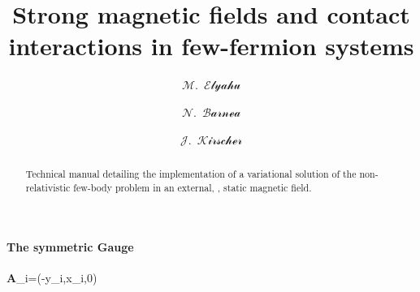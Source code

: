 \documentclass[aps,prd,onecolumn
,tightenlines,letterpaper,notitlepage,
nofootinbib]{revtex4-1}
\begin{document}
\newcommand{\rgm}{$\mathbb{R}$GM}
\newcommand{\bra}[1] {\left\langle~#1~\right|}
\newcommand{\ket}[1] {\left|~#1~\right\rangle}
\newcommand{\overlap}[2] {\left\langle~#1~\left|~#2~\right.\right\rangle}
\newcommand{\me}[3] {\left\langle~#1~\left|~#2~\left|~#3~\right.\right.\right\rangle}
\newcommand{\lam}[1]{$\Lambda=#1~$fm$^{-1}$}
\newcommand{\parg}[1] {\paragraph*{-\,\textit{#1}\,-}}
\newcommand{\nopi}{\pi\hspace{-6pt}/}
\newcommand{\ve}[1]{\ensuremath{\boldsymbol{#1}}}
\newcommand{\xvec}{\bs{x}}
\newcommand{\rvec}{\bs{r}}
\newcommand{\sgve}{\ensuremath{\boldsymbol{\sigma}}}
\newcommand{\tave}{\ensuremath{\boldsymbol{\tau}}}
\newcommand{\na}{\nabla}
\newcommand{\sumin}{\sum\limits_{i=1}^N}
\newcommand{\sumijn}{\sum\limits_{i<j}^N}
\newcommand{\sumijk}{\sum_\text{cyc.}\sum_{i<j<k}}
\newcommand{\prodcart}{\prod\limits_{c=x,y,z}}
\newcommand{\tx}{\tilde{x}}
\newcommand{\eftnopi}{\mbox{EFT($\slashed{\pi}$)}}

\newcommand{\cmment}[2]{\paragraph*{Ecce: #1}\texttt{\textcolor{blue}{#2}}}



\author{$\mathcal{M}$.~$\mathcal{Elyahu}$}
\author{$\mathcal{N}$.~$\mathcal{Barnea}$}
\author{$\mathcal{J}$.~$\mathcal{Kirscher}$}

\title{
Strong magnetic fields and contact interactions in few-fermion systems
} 

\begin{abstract}
Technical manual detailing the implementation of a variational solution of the non-relativistic few-body
problem in an external, \ie, static magnetic field.
\end{abstract}

\pacs{}

\maketitle

\paragraph{The symmetric Gauge}
\be{}
\ve{A}_i=(-y_i,x_i,0)
\ee
\end{document}
